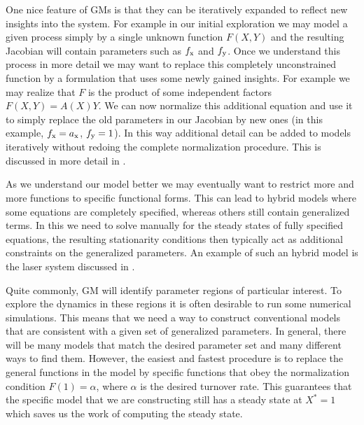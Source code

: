 \documentclass{article}
\begin{document}
One nice feature of GMs is that they can be iteratively expanded to reflect new insights into the system. 
For example in our initial exploration we may model a given process simply by a single unknown function $F(X,Y)$ and the resulting Jacobian will contain parameters such as $f_{\rm x}$ and $f_{\rm y}$. Once we understand this process in more detail we may want to replace this completely unconstrained function by a formulation that uses some newly gained insights. For example we may realize that $F$ is the product of some independent factors $F(X,Y)=A(X)Y$. We can now normalize this additional equation and use it to simply replace the old parameters in our Jacobian by new ones (in this example, $f_{\rm x}=a_{\rm x}$, $f_{\rm y}=1$).
In this way additional detail can be added to models iteratively without redoing the complete normalization procedure. This is discussed in more detail in \cite{Yeakel2011TE}.

As we understand our model better we may eventually want to restrict more and more functions to specific functional forms. This can lead to hybrid models where some equations are completely specified, whereas others still contain generalized terms. In this we need to solve manually for the steady states of fully specified equations, the resulting stationarity conditions then typically act as additional constraints on the generalized parameters. An example of such an hybrid model is the laser system discussed in \cite{Gross2006PRE}.  

Quite commonly, GM will identify parameter regions of particular interest. To explore the dynamics in these regions it is often desirable to run some numerical simulations. This means that we need a way to construct conventional models that are consistent with a given set of generalized parameters. In general, there will be many models that match the desired parameter set and many different ways to find them. However, the easiest and fastest procedure is to replace the general functions in the model by specific functions that obey the normalization condition $F(1)=\alpha$, where $\alpha$ is the desired turnover rate. This guarantees that the specific model that we are constructing still has a steady state at $X^*=1$ which saves us the work of computing the steady state. 
\end{document}
